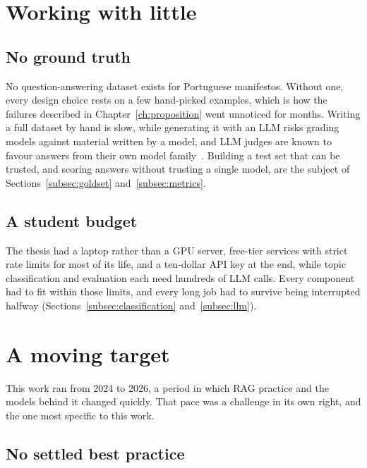 \section{Working with little} \label{sec:challenges-setting}

\subsection{No ground truth} \label{subsec:challenge-groundtruth}

No question-answering dataset exists for Portuguese manifestos. Without one, every design choice rests on a few hand-picked examples, which is how the failures described in Chapter~\ref{ch:proposition} went unnoticed for months. Writing a full dataset by hand is slow, while generating it with an LLM risks grading models against material written by a model, and LLM judges are known to favour answers from their own model family~\citep{zheng2023judging}. Building a test set that can be trusted, and scoring answers without trusting a single model, are the subject of Sections~\ref{subsec:goldset} and~\ref{subsec:metrics}.

\subsection{A student budget} \label{subsec:challenge-resources}

The thesis had a laptop rather than a GPU server, free-tier services with strict rate limits for most of its life, and a ten-dollar API key at the end, while topic classification and evaluation each need hundreds of LLM calls. Every component had to fit within those limits, and every long job had to survive being interrupted halfway (Sections~\ref{subsec:classification} and~\ref{subsec:llm}).

\section{A moving target} \label{sec:challenges-moving}

This work ran from 2024 to 2026, a period in which RAG practice and the models behind it changed quickly. That pace was a challenge in its own right, and the one most specific to this work.

\subsection{No settled best practice} \label{subsec:challenge-practices}

